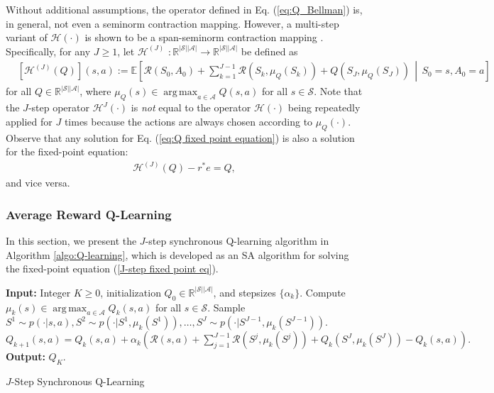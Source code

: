 \documentclass[11 pt]{article}
\DeclareMathOperator*{\argmax}{arg\,max}
\begin{document}
	Without additional assumptions, the operator defined in Eq. (\ref{eq:Q_Bellman}) is, in general, not even a seminorm contraction mapping. However, a multi-step variant of $\mathcal{H}(\cdot)$ is shown to be a span-seminorm contraction mapping \cite{puterman2014markov}. Specifically, for any $J\geq 1$, let $\mathcal{H}^{(J)}$ $:\mathbb{R}^{|\mathcal{S}| |\mathcal{A}|}\to\mathbb{R}^{|\mathcal{S}||\mathcal{A}|}$ be defined as
	\begin{align}\label{J-step Bellman}
		&[\mathcal{H}^{(J)}(Q)](s,a) := \mathbb{E}\left[\mathcal{R}(S_0,A_0)+\sum_{k=1}^{J-1}\mathcal{R}(S_k,\mu_Q(S_k))+Q(S_J,\mu_Q(S_J))\,\middle|\,S_0=s,A_0=a\right]
	\end{align}
	for all $Q\in\mathbb{R}^{|\mathcal{S}||\mathcal{A}|}$,
	where $\mu_{Q}(s)\in\argmax_{a\in\mathcal{A}}Q(s,a)$ for all $s\in\mathcal{S}$. Note that the $J$-step operator $\mathcal{H}^{J}(\cdot)$ is \textit{not} equal to the operator $\mathcal{H}(\cdot)$ being repeatedly applied for $J$ times because the actions are always chosen according to $\mu_Q(\cdot)$.
	Observe that any solution for Eq. (\ref{eq:Q fixed point equation}) is also a solution for the fixed-point equation:
	\begin{align}\label{J-step fixed point eq}
		\mathcal{H}^{(J)}(Q)-r^*e=Q,
	\end{align}
	and vice versa. 
	
	\subsubsection{Average Reward Q-Learning}
	In this section, we present the $J$-step synchronous Q-learning algorithm in Algorithm \ref{algo:Q-learning}, which is developed as an SA algorithm for solving the fixed-point equation (\ref{J-step fixed point eq}).
	
	
	\begin{algorithm}[ht]
		\begin{algorithmic}[1]
			\STATE \textbf{Input:} Integer $K\geq 0$, initialization $Q_0\in\mathbb{R}^{|\mathcal{S}||\mathcal{A}|}$, and stepsizes $\{\alpha_k\}$.
			\STATE Compute $\mu_{k}(s) \in\argmax_{a\in\mathcal{A}} Q_k(s, a)$ for all $s \in \mathcal{S}$.
			\STATE Sample $S^1 \sim p(\cdot|s,a), S^2 \sim p(\cdot|S^1,\mu_k(S^1)), \dots, S^J \sim p(\cdot|S^{J-1},\mu_k(S^{J-1})).$
			\STATE $Q_{k+1}(s,a)=Q_{k}(s,a) + \alpha_k \left(\mathcal{R}(s, a) +\sum_{j=1}^{J-1} \mathcal{R}(S^j, \mu_k(S^j)) + Q_{k}(S^J, \mu_k(S^J)) - Q_k(s,a)\right).$
			\ENDFOR
			\ENDFOR
			\STATE \textbf{Output:} $Q_K$.
		\end{algorithmic}
		\caption{$J$-Step Synchronous Q-Learning} 
		\label{algo:Q-learning}
	\end{algorithm} 
	
\end{document}
